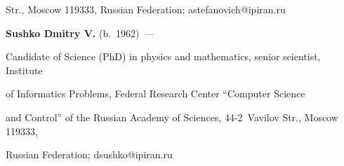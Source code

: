 Str., Moscow 119333, Russian Federation; \mbox{astefanovich@ipiran.ru} 



\vspace*{3pt}



\noindent

\textbf{Sushko Dmitry V.} (b.\ 1962)~---

Candidate of Science (PhD) in physics and mathematics, senior scientist, Institute 

of Informatics Problems, Federal Research Center ``Computer Science

and Control'' of the Russian Academy of Sciences, 44-2~Vavilov Str., Moscow 119333, 

Russian Federation; \mbox{dsushko@ipiran.ru} 

\label{end\stat}





\renewcommand{\bibname}{\protect\rm Литература} 

